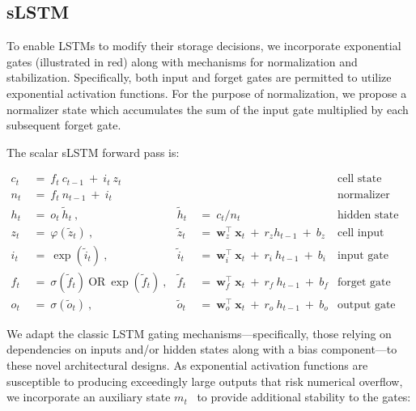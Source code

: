 \subsection{sLSTM}
\label{sec:sLSTM}

To enable LSTMs to modify their storage decisions, we incorporate exponential gates (illustrated in red) along with mechanisms for normalization and stabilization. Specifically, both input and forget gates are permitted to utilize exponential activation functions. For the purpose of normalization, we propose a normalizer state which accumulates the sum of the input gate multiplied by each subsequent forget gate.

The scalar sLSTM forward pass is:

\begin{align}
\label{eq:slstmforward}
c_t \ &= \  f_t \ c_{t-1} \ + \ i_t \ z_t & & 
 &\text{cell state} \\
n_t \ &= \  f_t \ n_{t-1} \ + \ i_t  & & 
 &\text{normalizer state} \\
h_t \ &= \ o_t \ \tilde{h}_t \ ,
  &\tilde{h}_t \ &= \ c_t / n_t
&\text{hidden state} \\
z_t \ &= \ \varphi \left( \tilde{z}_t \right) \ , 
  &\tilde{z}_t \ &=  \ \mathbf{w}^\top_{z} \ \mathbf{x}_t \ + \
  r_{z}  h_{t-1} \ + \  b_{z}
  &\text{cell input} \\
i_t \ &= \ \!\exp \left( \tilde{i}_t  \right) \ , 
  &\tilde{i}_t \ &= \ \mathbf{w}^\top_{i} \ \mathbf{x}_t \ + \
  r_{i}  \ h_{t-1} \ + \  b_{i}
  &\text{input gate} \\
f_t \ &= \ \sigma \left(  \tilde{f}_t \right) \ \text{OR} \
\!\exp \left(  \tilde{f}_t \right) \ ,
  &\tilde{f}_t \ &= \ \mathbf{w}^\top_{f} \ \mathbf{x}_t  \ + \
  r_{f}  \ h_{t-1} \ + \  b_{f}
  &\text{forget gate} \\
o_t \ &= \ \sigma \left( \tilde{o}_t \right) \ , 
  &\tilde{o}_t  \ &= \ \mathbf{w}^\top_{o} \ \mathbf{x}_t \ + \
  r_{o}  \ h_{t-1} \ + \  b_{o}
  &\text{output gate} 
\end{align}

We adapt the classic LSTM gating mechanisms—specifically, those relying on dependencies on inputs and/or hidden states along with a bias component—to these novel architectural designs. As exponential activation functions are susceptible to producing exceedingly large outputs that risk numerical overflow, we incorporate an auxiliary state \mbox{$m_t$~\citep{Milakov:18arxiv}} to provide additional stability to the gates:

